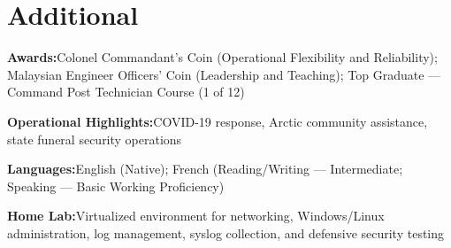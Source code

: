 \documentclass[10pt,letterpaper]{article}
\newcommand{\resumeLine}[2]{%
  \par\noindent\textbf{#1}\hspace{0.35em}#2\par\vspace{1pt}%
}
\begin{document}
\section{Additional}
\resumeLine{Awards:}{Colonel Commandant's Coin (Operational Flexibility and Reliability); Malaysian Engineer Officers' Coin (Leadership and Teaching); Top Graduate --- Command Post Technician Course (1 of 12)}
\resumeLine{Operational Highlights:}{COVID-19 response, Arctic community assistance, state funeral security operations}
\resumeLine{Languages:}{English (Native); French (Reading/Writing --- Intermediate; Speaking --- Basic Working Proficiency)}
\resumeLine{Home Lab:}{Virtualized environment for networking, Windows/Linux administration, log management, syslog collection, and defensive security testing}
\end{document}
